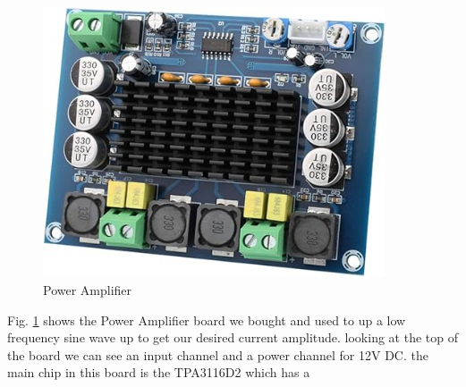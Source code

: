 \begin{figure}[H]
    \centering
    \includegraphics[height=8cm]{power_amp.jpg}
    \caption{Power Amplifier}
    \label{fig:Power Amplifier}
\end{figure}
Fig. \ref{fig:Power Amplifier} shows the Power Amplifier board we bought and used to up a low frequency sine wave up to get our desired current amplitude. looking at the top of the board we can see an input channel and a power channel for 12V DC. the main chip in this board is the TPA3116D2 which has a 